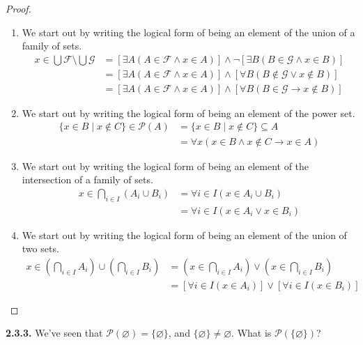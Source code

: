 \documentclass[12pt]{amsart}
\newenvironment{statement}[1]{\smallskip\noindent\color[rgb]{.6627, .3529, .6314} {\bf #1.}}{}
\theoremstyle{definition}
\theoremstyle{remark}
\begin{document}
\begin{proof}
\hfill
\begin{enumerate}
	\item We start out by writing the logical form of being an element of the union of a family of sets.
	\begin{align*}
		x \in \bigcup \mathcal{F} \setminus \bigcup \mathcal{G}
		&= [\exists A (A \in \mathcal{F} \wedge x \in A)] \wedge
			\neg [\exists B (B  \in \mathcal{G} \wedge x \in B)] \\
		&= [\exists A (A \in \mathcal{F} \wedge x \in A)] \wedge
			[\forall B (B \notin \mathcal{G} \vee x \notin B)] \\
		&= [\exists A (A \in \mathcal{F} \wedge x \in A)] \wedge
			[\forall B (B \in \mathcal{G} \rightarrow x \notin B)]
	\end{align*}
	
	\item We start out by writing the logical form of being an element of the power set.
	\begin{align*}
		\{ x \in B \mid x \notin C \} \in \mathscr{P}(A)
		&= \{ x \in B \mid x \notin C \} \subseteq A \\
		&= \forall x (x \in B \wedge x \notin C \rightarrow x \in A)
	\end{align*}
	
	\item We start out by writing the logical form of being an element of the intersection of a
	family of sets.
	\begin{align*}
		x \in \bigcap_{i \in I} (A_i \cup B_i)
		&= \forall i \in I (x \in A_i \cup B_i) \\
		&= \forall i \in I (x \in A_i \vee x \in B_i)
	\end{align*}
	
	\item We start out by writing the logical form of being an element of the union of two sets.
	\begin{align*}
		x \in \left( \bigcap_{i \in I} A_i \right) \cup \left( \bigcap_{i \in I} B_i \right)
		&= \left( x \in \bigcap_{i \in I} A_i \right) \vee
			\left( x \in \bigcap_{i \in I} B_i \right) \\
		&= [\forall i \in I (x \in A_i)] \vee [\forall i \in I (x \in B_i)]
	\end{align*}
\end{enumerate}
\end{proof}


\begin{statement}{2.3.3}
We've seen that $\mathscr{P}(\varnothing) = \{ \varnothing \}$, and
$\{ \varnothing \} \neq \varnothing$.
What is $\mathscr{P}( \{ \varnothing \} )$?
\end{statement}
\end{document}
